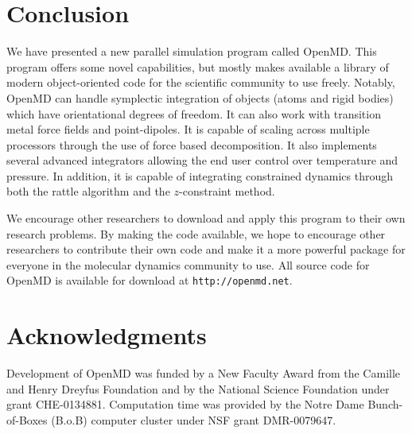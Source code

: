 \documentclass[]{book}
\begin{document}
\chapter{\label{section:conclusion}Conclusion}

We have presented a new parallel simulation program called {\sc
OpenMD}. This program offers some novel capabilities, but mostly makes
available a library of modern object-oriented code for the scientific
community to use freely.  Notably, {\sc OpenMD} can handle symplectic
integration of objects (atoms and rigid bodies) which have
orientational degrees of freedom.  It can also work with transition
metal force fields and point-dipoles. It is capable of scaling across
multiple processors through the use of force based decomposition. It
also implements several advanced integrators allowing the end user
control over temperature and pressure. In addition, it is capable of
integrating constrained dynamics through both the {\sc rattle}
algorithm and the $z$-constraint method.

We encourage other researchers to download and apply this program to
their own research problems.  By making the code available, we hope to
encourage other researchers to contribute their own code and make it a
more powerful package for everyone in the molecular dynamics community
to use.  All source code for {\sc OpenMD} is available for download at
{\tt http://openmd.net}.

\chapter{Acknowledgments}

Development of {\sc OpenMD} was funded by a New Faculty Award from the
Camille and Henry Dreyfus Foundation and by the National Science
Foundation under grant CHE-0134881. Computation time was provided by
the Notre Dame Bunch-of-Boxes (B.o.B) computer cluster under NSF grant
DMR-0079647.




\end{document}
